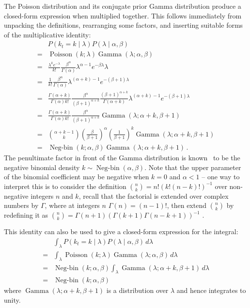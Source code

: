 \documentclass[twoside, 11pt]{article}
\DeclareMathOperator*{\gammad}{Gamma}
\DeclareMathOperator*{\poissond}{Poisson}
\DeclareMathOperator*{\negbind}{Neg-bin}
\begin{document}
The Poisson distribution and its conjugate prior Gamma distribution produce a closed-form expression when multiplied together. This follows immediately from unpacking the definitions, rearranging some factors, and inserting suitable forms of the multiplicative identity:
\begin{align}
& P(k_t = k \mid \lambda) P(\lambda \mid \alpha, \beta)
\nonumber \\
= &
\poissond( k ; \lambda) \gammad( \lambda ; \alpha, \beta)
\nonumber \\
= &
\frac{\lambda^k e^{-\lambda}}{k!}
\frac{\beta^{\alpha}}{\Gamma(\alpha)}
\lambda^{\alpha-1} e^{-\beta \lambda}
\lambda \nonumber \\
= &
\frac{1}{k!}
\frac{\beta^{\alpha}}{\Gamma(\alpha)}
\lambda^{(\alpha+k)-1} e^{-(\beta+1) \lambda}
\nonumber \\
= &
\frac{\Gamma(\alpha+k)}{\Gamma(\alpha) k!}
\frac{\beta^{\alpha}}{(\beta+1)^{\alpha+k}}
\frac{(\beta+1)^{\alpha+k}}{\Gamma(\alpha+k)}
\lambda^{(\alpha+k)-1} e^{-(\beta+1) \lambda}
\nonumber \\
= &
\frac{\Gamma(\alpha+k)}{\Gamma(\alpha) k!}
\frac{\beta^{\alpha}}{(\beta+1)^{\alpha+k}}
\gammad(\lambda ; \alpha+k, \beta+1)
\nonumber \\
= &
\binom{\alpha+k-1}{k} \left( \frac{\beta}{\beta+1} \right)^{\alpha} \left( \frac{1}{\beta+1} \right)^{k}
\gammad(\lambda ; \alpha+k, \beta+1)
\nonumber \\
= &
\negbind(k ; \alpha, \beta)
\gammad(\lambda ; \alpha+k, \beta+1) \, .
\nonumber
\end{align}
The penultimate factor in front of the Gamma distribution is known~\citep{gelman2013bayesian} to be the negative binomial density $k \sim \negbind\left(\alpha, \beta\right)$. Note that the upper parameter of the binomial coefficient may be negative when $k=0$ and $\alpha < 1$ -- one way to interpret this is to consider the definition $\binom{n}{k} = n! (k! (n-k)!)^{-1}$ over non-negative integers $n$ and $k$, recall that the factorial is extended over complex numbers by $\Gamma$, where at integers $n$ $\Gamma(n) = (n-1)!$, then extend $\binom{n}{k}$ by redefining it as $\binom{n}{k} = \Gamma(n+1) (\Gamma(k+1) \Gamma(n-k+1))^{-1}$ .

This identity can also be used to give a closed-form expression for the integral: 
\begin{align}
& \int_{\lambda}
P(k_t = k \mid \lambda) P(\lambda \mid \alpha, \beta)
\, d \lambda \nonumber \\
= & \int_{\lambda}
\poissond( k ; \lambda) \gammad( \lambda ; \alpha, \beta)
\, d \lambda \nonumber \\
= & \negbind(k ; \alpha, \beta) \int_{\lambda}
\gammad(\lambda ; \alpha+k, \beta+1)
\, d \lambda \nonumber \\
= & \negbind(k ; \alpha, \beta) \nonumber
\end{align}
where $\gammad(\lambda ; \alpha+k, \beta+1)$ is a distribution over $\lambda$ and hence integrates to unity.


\end{document}
